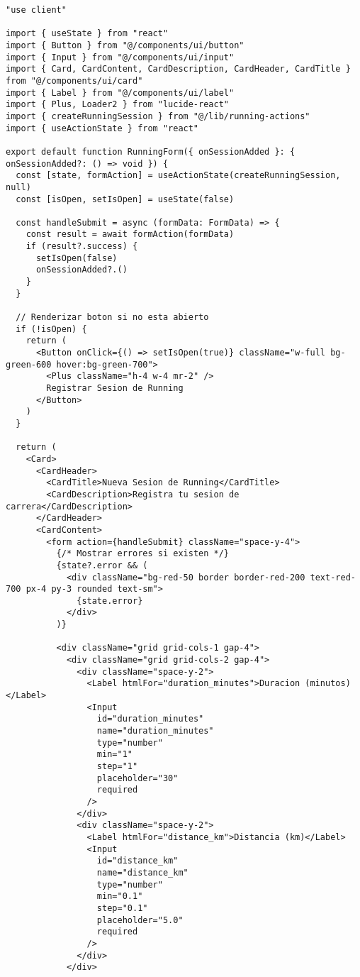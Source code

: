 \documentclass[12pt,a4paper]{article}
\begin{document}
\begin{lstlisting}[caption=components/running/running-form.tsx - Estructura principal]
"use client"

import { useState } from "react"
import { Button } from "@/components/ui/button"
import { Input } from "@/components/ui/input"
import { Card, CardContent, CardDescription, CardHeader, CardTitle } from "@/components/ui/card"
import { Label } from "@/components/ui/label"
import { Plus, Loader2 } from "lucide-react"
import { createRunningSession } from "@/lib/running-actions"
import { useActionState } from "react"

export default function RunningForm({ onSessionAdded }: { onSessionAdded?: () => void }) {
  const [state, formAction] = useActionState(createRunningSession, null)
  const [isOpen, setIsOpen] = useState(false)

  const handleSubmit = async (formData: FormData) => {
    const result = await formAction(formData)
    if (result?.success) {
      setIsOpen(false)
      onSessionAdded?.()
    }
  }

  // Renderizar boton si no esta abierto
  if (!isOpen) {
    return (
      <Button onClick={() => setIsOpen(true)} className="w-full bg-green-600 hover:bg-green-700">
        <Plus className="h-4 w-4 mr-2" />
        Registrar Sesion de Running
      </Button>
    )
  }

  return (
    <Card>
      <CardHeader>
        <CardTitle>Nueva Sesion de Running</CardTitle>
        <CardDescription>Registra tu sesion de carrera</CardDescription>
      </CardHeader>
      <CardContent>
        <form action={handleSubmit} className="space-y-4">
          {/* Mostrar errores si existen */}
          {state?.error && (
            <div className="bg-red-50 border border-red-200 text-red-700 px-4 py-3 rounded text-sm">
              {state.error}
            </div>
          )}

          <div className="grid grid-cols-1 gap-4">
            <div className="grid grid-cols-2 gap-4">
              <div className="space-y-2">
                <Label htmlFor="duration_minutes">Duracion (minutos)</Label>
                <Input
                  id="duration_minutes"
                  name="duration_minutes"
                  type="number"
                  min="1"
                  step="1"
                  placeholder="30"
                  required
                />
              </div>
              <div className="space-y-2">
                <Label htmlFor="distance_km">Distancia (km)</Label>
                <Input
                  id="distance_km"
                  name="distance_km"
                  type="number"
                  min="0.1"
                  step="0.1"
                  placeholder="5.0"
                  required
                />
              </div>
            </div>


\end{lstlisting}
\end{document}
